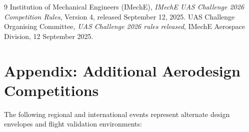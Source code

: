 \documentclass[11pt,a4paper]{article}
\begin{document}
\begin{thebibliography}{9}
Institution of Mechanical Engineers (IMechE), \emph{IMechE UAS Challenge 2026 Competition Rules}, Version 4, released September 12, 2025.
UAS Challenge Organising Committee, \emph{UAS Challenge 2026 rules released}, IMechE Aerospace Division, 12 September 2025.
\end{thebibliography}

\section*{Appendix: Additional Aerodesign Competitions}
The following regional and international events represent alternate design envelopes and flight validation environments:
\end{document}
